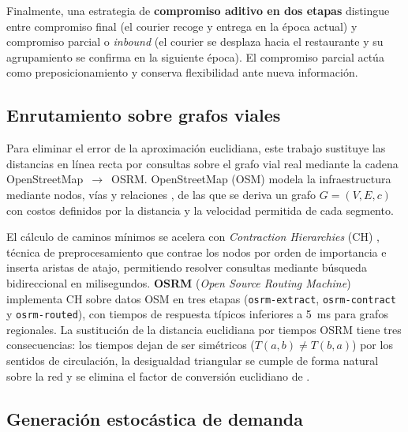 \documentclass[12pt,letterpaper]{article}
\begin{document}
Finalmente, una estrategia de \textbf{compromiso aditivo en dos etapas}
\citep{Reyes2018} distingue entre compromiso final (el courier recoge y entrega
en la época actual) y compromiso parcial o \textit{inbound} (el courier se
desplaza hacia el restaurante y su agrupamiento se confirma en la siguiente
época). El compromiso parcial actúa como preposicionamiento y conserva
flexibilidad ante nueva información.

\subsection{Enrutamiento sobre grafos viales}

Para eliminar el error de la aproximación euclidiana, este trabajo sustituye las
distancias en línea recta por consultas sobre el grafo vial real mediante la
cadena OpenStreetMap~$\rightarrow$~OSRM. OpenStreetMap (OSM) modela la
infraestructura mediante nodos, vías y relaciones \citep{Haklay2010,Boeing2021},
de las que se deriva un grafo $G=(V,E,c)$ con costos definidos por la distancia y
la velocidad permitida de cada segmento.

El cálculo de caminos mínimos se acelera con \textit{Contraction Hierarchies} (CH)
\citep{Geisberger2008}, técnica de preprocesamiento que contrae los nodos por
orden de importancia e inserta aristas de atajo, permitiendo resolver consultas
mediante búsqueda bidireccional en milisegundos. \textbf{OSRM} (\textit{Open
Source Routing Machine}) implementa CH sobre datos OSM en tres etapas
(\texttt{osrm-extract}, \texttt{osrm-contract} y \texttt{osrm-routed}), con
tiempos de respuesta típicos inferiores a 5~ms para grafos regionales. La
sustitución de la distancia euclidiana por tiempos OSRM tiene tres consecuencias:
los tiempos dejan de ser simétricos ($T(a,b)\neq T(b,a)$) por los sentidos de
circulación, la desigualdad triangular se cumple de forma natural sobre la red y
se elimina el factor de conversión euclidiano de \citet{Reyes2018}.

\subsection{Generación estocástica de demanda}
\end{document}
